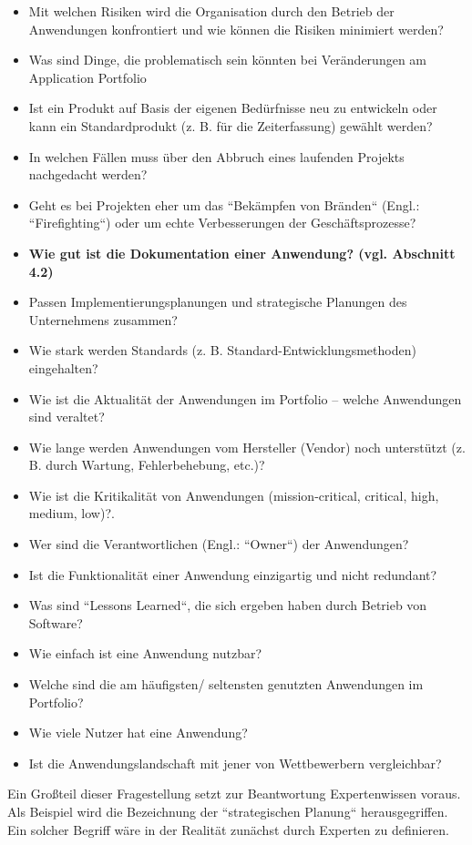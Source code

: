 \begin{itemize}
\item Mit welchen Risiken wird die Organisation durch den Betrieb der Anwendungen konfrontiert und wie können die Risiken minimiert werden?
\item Was sind Dinge, die problematisch sein könnten bei Veränderungen am Application Portfolio
\item Ist ein Produkt auf Basis der eigenen Bedürfnisse neu zu entwickeln oder kann ein Standardprodukt (z. B. für die Zeiterfassung) gewählt werden?
\item In welchen Fällen muss über den Abbruch eines laufenden Projekts nachgedacht werden?
\item Geht es bei Projekten eher um das ``Bekämpfen von Bränden`` (Engl.: ``Firefighting``) oder um echte Verbesserungen der Geschäftsprozesse?
\item {\bf Wie gut ist die Dokumentation einer Anwendung? (vgl. Abschnitt 4.2)}
\item Passen Implementierungsplanungen und strategische Planungen des Unternehmens zusammen?
\item Wie stark werden Standards (z. B. Standard-Entwicklungsmethoden) eingehalten?
\item Wie ist die Aktualität der Anwendungen im Portfolio – welche Anwendungen sind veraltet?
\item Wie lange werden Anwendungen vom Hersteller (Vendor) noch unterstützt (z. B. durch Wartung, Fehlerbehebung, etc.)?
\item Wie ist die Kritikalität von Anwendungen (mission-critical, critical, high, medium, low)?.
\item Wer sind die Verantwortlichen (Engl.: ``Owner``) der Anwendungen?
\item Ist die Funktionalität einer Anwendung einzigartig und nicht redundant?
\item Was sind ``Lessons Learned``, die sich ergeben haben durch Betrieb von Software?
\item Wie einfach ist eine Anwendung nutzbar?
\item Welche sind die am häufigsten/ seltensten genutzten Anwendungen im Portfolio?
\item Wie viele Nutzer hat eine Anwendung?
\item Ist die Anwendungslandschaft mit jener von Wettbewerbern vergleichbar?

\end{itemize}

Ein Großteil dieser Fragestellung setzt zur Beantwortung Expertenwissen voraus. Als Beispiel wird die Bezeichnung der ``strategischen Planung`` herausgegriffen. Ein solcher Begriff wäre in der Realität zunächst durch Experten zu definieren. 

